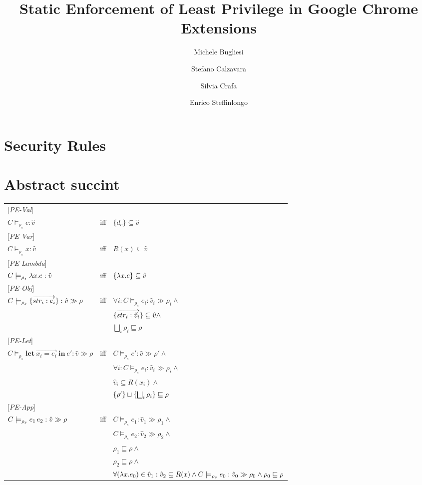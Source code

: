 \documentclass[[12pt,a4paper,twoside,openrigh]{article}
\author{Michele Bugliesi \and Stefano Calzavara \and Silvia Crafa \and Enrico Steffinlongo}
\title{Static Enforcement of Least Privilege in Google Chrome Extensions}
\newcommand{\vat}[0]{\hat{v}}
\newcommand{\modelrho}{\models_{\rho_s}}
\newcommand{\letexprs}[3]{\mathbf{let}\ \vec{#1 = #2}\ \mathbf{in}\ #3}
\newcommand{\caesti}[2]{C \modelrho #1 : \vat_{#2} \gg \rho_{#2}}
\newcommand{\caest}[1]{C \modelrho #1 : \vat \gg \rho}
\begin{document}
\maketitle
\tableofcontents

\section{Security Rules}
\section{Abstract succint}

\begin{tabular}{l l l}
{[\textit{PE-Val}]} \\
$C \modelrho c : \vat$ & iff & $\{d_c\} \subseteq \vat$ \\ 
{[\textit{PE-Var}]} \\
$C \modelrho x : \vat$ & iff & $R(x) \subseteq \vat$ \\ 
{[\textit{PE-Lambda}]} \\
$C \modelrho \lam{x}{e} : \vat$ & iff & $\{\lam{x}{e}\} \subseteq \vat$ \\
{[\textit{PE-Obj}]} \\
$\caest {\rec{\vec{str_i : e_i}}}$ & iff & $\forall i: \caesti {e_i} {i} \wedge$\\
&& $\rec{\vec{str_i :\vat_i}} \subseteq \vat \wedge$ \\
&& $\bigsqcup_{i} \rho_i \sqsubseteq \rho$ \\ 
{[\textit{PE-Let}]} \\
$\caest {\letexprs{x_i}{e_i}{e'}}$ & iff & $C \modelrho e' : \vat \gg \rho' \wedge$ \\
&& $ \forall i: \caesti {e_i} {i} \wedge$ \\
&& $\vat_i \subseteq R(x_i) \wedge$ \\
&& $ \{\rho'\} \sqcup \{\bigsqcup_i \rho_i\} \sqsubseteq \rho$ \\
{[\textit{PE-App}]} \\
$\caest {\appl {e_1} {e_2}}$ & iff & $ \caesti {e_1} {1} \wedge$ \\
&& $\caesti {e_2} {2} \wedge$ \\
&& $\rho_1 \sqsubseteq \rho \wedge$ \\
&& $\rho_2 \sqsubseteq \rho \wedge$ \\
&& $\forall (\lam{x}{e_0}) \in \vat_1 : \vat_2 \subseteq R(x) \wedge \caesti {e_0} {0} \wedge \rho_0 \sqsubseteq \rho $\\

\end{tabular}
\end{document}
